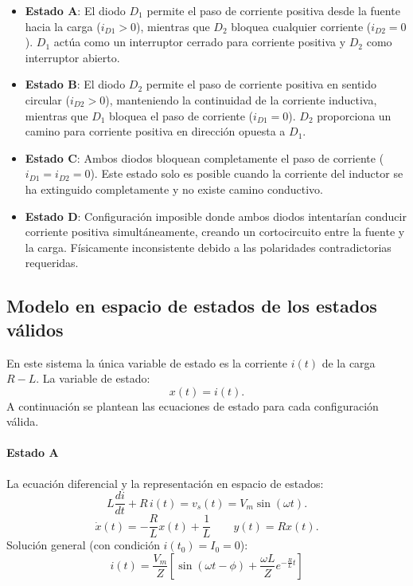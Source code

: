 \documentclass[conference]{IEEEtran}
\begin{document}
\begin{itemize}
      \item \textbf{Estado A}: 
      El diodo $D_1$ permite el paso de corriente positiva desde la fuente hacia la carga ($i_{D1} > 0$), mientras que $D_2$ bloquea cualquier corriente ($i_{D2} = 0$). $D_1$ actúa como un interruptor cerrado para corriente positiva y $D_2$ como interruptor abierto.

      \item \textbf{Estado B}: 
      El diodo $D_2$ permite el paso de corriente positiva en sentido circular ($i_{D2} > 0$), manteniendo la continuidad de la corriente inductiva, mientras que $D_1$ bloquea el paso de corriente ($i_{D1} = 0$). $D_2$ proporciona un camino para corriente positiva en dirección opuesta a $D_1$.

      \item \textbf{Estado C}: 
      Ambos diodos bloquean completamente el paso de corriente ($i_{D1} = i_{D2} = 0$). Este estado solo es posible cuando la corriente del inductor se ha extinguido completamente y no existe camino conductivo.

      \item \textbf{Estado D}: 
      Configuración imposible donde ambos diodos intentarían conducir corriente positiva simultáneamente, creando un cortocircuito entre la fuente y la carga. Físicamente inconsistente debido a las polaridades contradictorias requeridas.
\end{itemize}
 


\subsection{Modelo en espacio de estados de los estados válidos }
En este sistema la única variable de estado es la corriente \(i(t)\) de la carga \(R\!-\!L\). La variable de estado:
\[
x(t)=i(t).
\]
A continuación se plantean las ecuaciones de estado para cada configuración válida.

\paragraph{Estado A}
La ecuación diferencial y la representación en espacio de estados:
\[
L\frac{di}{dt} + R\,i(t) = v_s(t) = V_m\sin(\omega t).
\]
\[
\dot{x}(t)
=
-\dfrac{R}{L}
x(t)
+
\dfrac{1}{L}
\qquad
y(t)=Rx(t).
\]
Solución general (con condición \(i(t_0)=I_0=0\)):
\[
i(t) = \frac{V_m}{Z} \left[ \sin(\omega t - \phi) + \frac{\omega L}{Z} e^{-\frac{R}{L}t} \right]
\]
\end{document}
